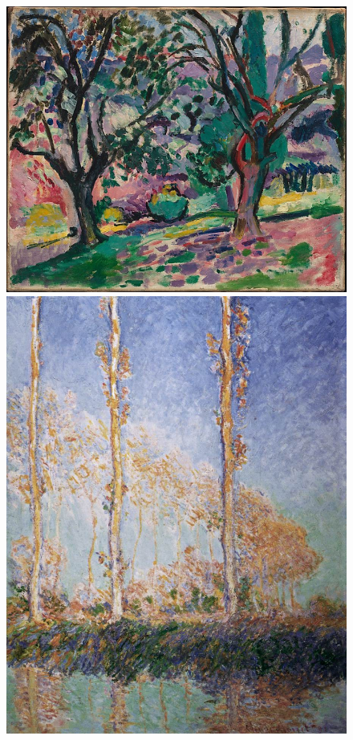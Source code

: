\documentclass[a4paper]{article}
\begin{document}
\begin {figure}[h!]
\centering
\begin{minipage}[b]{.49\textwidth}
	\centering
	\includegraphics[width=\textwidth]{ForestPaintings/_Ext__Henri_Matisse_-_Olive_Trees_at_Collioure.jpg}
\end{minipage}
\hfill
\begin{minipage}[b]{.49\textwidth}
	\centering
	\includegraphics[width=\textwidth]{ForestPaintings/_Ext___Stl___Wth__Claude_Monet_-_Poplars.jpg}

\end{minipage}
\end{figure}
\end{document}
